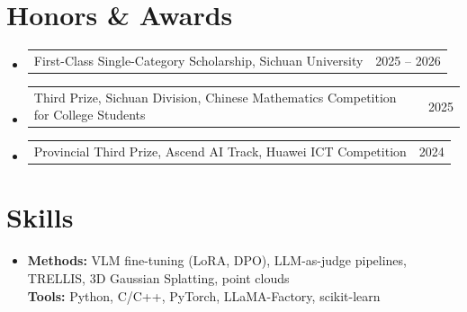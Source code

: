 \documentclass[a4paper,11pt]{article}
\makeatletter
\newcommand{\resumeLineListStart}{\begin{itemize}[leftmargin=0.15in, label={}, itemsep=4pt, parsep=0pt]}
\newcommand{\resumeLineListEnd}{\end{itemize}}
\newcommand{\resumeLine}[1]{\item\small{#1}}
\newcommand{\resumeDatedLine}[2]{
    \item
    \begin{tabularx}{0.97\textwidth}{@{}>{\raggedright\arraybackslash}X@{\hspace{1.5em}}r@{}}
      \small#1 & \small#2 \\
    \end{tabularx}\vspace{-4pt}
}
\makeatother
\begin{document}
\section{Honors \& Awards}
  \resumeLineListStart
    \resumeDatedLine{First-Class Single-Category Scholarship, Sichuan University}{2025 -- 2026}
    \resumeDatedLine{Third Prize, Sichuan Division, Chinese Mathematics Competition for College Students}{2025}
    \resumeDatedLine{Provincial Third Prize, Ascend AI Track, Huawei ICT Competition}{2024}
  \resumeLineListEnd

\section{Skills}
  \resumeLineListStart
    \resumeLine{\textbf{Methods:} VLM fine-tuning (LoRA, DPO), LLM-as-judge pipelines, TRELLIS, 3D Gaussian Splatting, point clouds \\
      \textbf{Tools:} Python, C/C++, PyTorch, LLaMA-Factory, scikit-learn}
  \resumeLineListEnd

\end{document}
